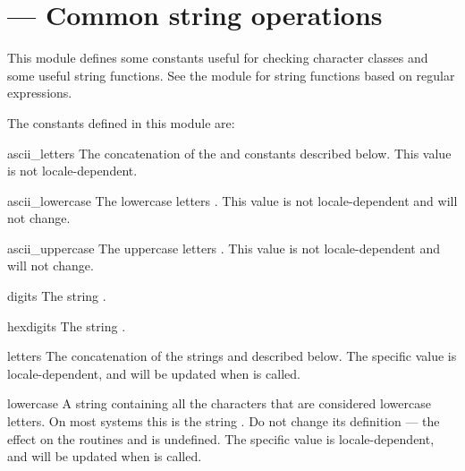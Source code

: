 \section{ ---
         Common string operations}



This module defines some constants useful for checking character
classes and some useful string functions.  See the module
 for string functions based on regular
expressions.

The constants defined in this module are:

\begin{datadesc}{ascii_letters}
  The concatenation of the  and
   constants described below.  This value is
  not locale-dependent.
\end{datadesc}

\begin{datadesc}{ascii_lowercase}
  The lowercase letters .  This
  value is not locale-dependent and will not change.
\end{datadesc}

\begin{datadesc}{ascii_uppercase}
  The uppercase letters .  This
  value is not locale-dependent and will not change.
\end{datadesc}

\begin{datadesc}{digits}
  The string .
\end{datadesc}

\begin{datadesc}{hexdigits}
  The string .
\end{datadesc}

\begin{datadesc}{letters}
  The concatenation of the strings  and
   described below.  The specific value is
  locale-dependent, and will be updated when
   is called.
\end{datadesc}

\begin{datadesc}{lowercase}
  A string containing all the characters that are considered lowercase
  letters.  On most systems this is the string
  .  Do not change its definition ---
  the effect on the routines  and
   is undefined.  The specific value is
  locale-dependent, and will be updated when
   is called.
\end{datadesc}

